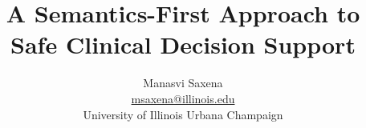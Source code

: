 


\title{A Semantics-First Approach to Safe Clinical Decision Support}
\author{Manasvi Saxena \\
\href{mailto:msaxena2@illinois.edu}{msaxena@illinois.edu} \\
University of Illinois Urbana Champaign}

\date{}
\maketitle

%
% 


%





\newpage




